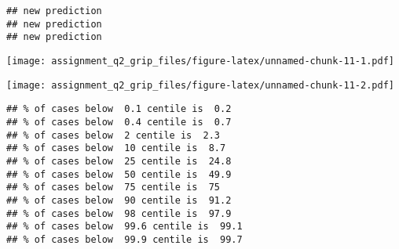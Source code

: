 \begin{verbatim}
## new prediction 
## new prediction 
## new prediction
\end{verbatim}

\texttt{[image: assignment\_q2\_grip\_files/figure-latex/unnamed-chunk-11-1.pdf]}

\begin{Shaded}
\begin{Highlighting}[]
\SpecialCharTok{$}\NormalTok{(}\NormalTok{, }\NormalTok{, }\NormalTok{,}\NormalTok{, }\NormalTok{, }\NormalTok{,}\NormalTok{,}\NormalTok{,}\NormalTok{,}\NormalTok{, }\NormalTok{), }\NormalTok{, }\NormalTok{, }\NormalTok{)}
\end{Highlighting}
\end{Shaded}

\texttt{[image: assignment\_q2\_grip\_files/figure-latex/unnamed-chunk-11-2.pdf]}

\begin{verbatim}
## % of cases below  0.1 centile is  0.2 
## % of cases below  0.4 centile is  0.7 
## % of cases below  2 centile is  2.3 
## % of cases below  10 centile is  8.7 
## % of cases below  25 centile is  24.8 
## % of cases below  50 centile is  49.9 
## % of cases below  75 centile is  75 
## % of cases below  90 centile is  91.2 
## % of cases below  98 centile is  97.9 
## % of cases below  99.6 centile is  99.1 
## % of cases below  99.9 centile is  99.7
\end{verbatim}

\begin{Shaded}
\begin{Highlighting}[]
\SpecialCharTok{$}\SpecialCharTok{$}\NormalTok{, }\NormalTok{, }\NormalTok{, }\NormalTok{)}
\end{Highlighting}
\end{Shaded}


